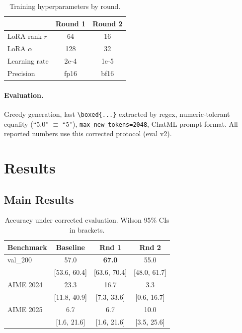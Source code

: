 \documentclass[10pt,twocolumn]{article}
\begin{document}
\begin{table}[h]
\centering
\small
\caption{Training hyperparameters by round.}
\label{tab:hparams}
\vspace{2pt}
\begin{tabular}{lcc}
\toprule
& \textbf{Round 1} & \textbf{Round 2} \\
\midrule
LoRA rank $r$ & 64 & 16 \\
LoRA $\alpha$ & 128 & 32 \\
Learning rate & 2e-4 & 1e-5 \\
Precision & fp16 & bf16 \\
\bottomrule
\end{tabular}
\end{table}

\paragraph{Evaluation.} Greedy generation, last \texttt{\textbackslash boxed\{...\}} extracted by regex, numeric-tolerant equality (``5.0'' $\equiv$ ``5''), \texttt{max\_new\_tokens=2048}, ChatML prompt format. All reported numbers use this corrected protocol (eval v2).

\section{Results}

\subsection{Main Results}

\begin{table}[h]
\centering
\small
\caption{Accuracy under corrected evaluation. Wilson 95\% CIs in brackets.}
\label{tab:main}
\vspace{2pt}
\begin{tabular}{lccc}
\toprule
\textbf{Benchmark} & \textbf{Baseline} & \textbf{Rnd 1} & \textbf{Rnd 2} \\
\midrule
val\_200       & 57.0 & \textbf{67.0} & 55.0 \\
               & {\small[53.6, 60.4]} & {\small[63.6, 70.4]} & {\small[48.0, 61.7]} \\[2pt]
AIME 2024      & 23.3 & 16.7 & 3.3 \\
               & {\small[11.8, 40.9]} & {\small[7.3, 33.6]} & {\small[0.6, 16.7]} \\[2pt]
AIME 2025      & 6.7  & 6.7  & 10.0 \\
               & {\small[1.6, 21.6]} & {\small[1.6, 21.6]} & {\small[3.5, 25.6]} \\
\bottomrule
\end{tabular}
\end{table}
\end{document}
